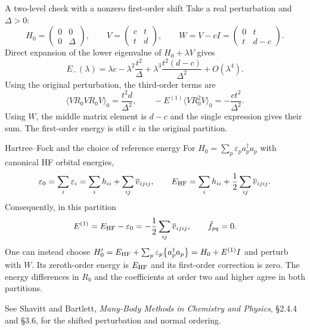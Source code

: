 \documentclass[aspectratio=169,10pt]{beamer}
\newcommand{\av}[1]{\langle #1\rangle_0}
\newcommand{\cre}[1]{a_{#1}^{\dagger}}
\newcommand{\ann}[1]{a_{#1}}
\newcommand{\no}[1]{\bigl\{#1\bigr\}}
\newcommand{\vbar}[4]{\overline v_{#1#2#3#4}}
\newcommand{\ftil}[1]{\tilde f_{#1}}
\begin{document}
\begin{frame}{A two-level check with a nonzero first-order shift}
Take a real perturbation and $\Delta>0$:
\[
 H_0=\begin{pmatrix}0&0\\0&\Delta\end{pmatrix},\qquad
 V=\begin{pmatrix}c&t\\t&d\end{pmatrix},\qquad
 W=V-cI=\begin{pmatrix}0&t\\t&d-c\end{pmatrix}.
\]
Direct expansion of the lower eigenvalue of $H_0+\lambda V$ gives
\[
 E_-(\lambda)=\lambda c-\lambda^2\frac{t^2}{\Delta}
       +\lambda^3\frac{t^2(d-c)}{\Delta^2}+O(\lambda^4).
\]
Using the original perturbation, the third-order terms are
\[
 \av{VR_0VR_0V}=\frac{t^2d}{\Delta^2},\qquad
 -E^{(1)}\av{VR_0^2V}=-\frac{ct^2}{\Delta^2}.
\]
Using $W$, the middle matrix element is $d-c$ and the single expression gives their sum. The first-order energy is still $c$ in the original partition.
\end{frame}

\begin{frame}{Hartree--Fock and the choice of reference energy}
For $H_0=\sum_p\varepsilon_p\cre{p}\ann{p}$ with canonical HF orbital energies,
\[
 \varepsilon_0=\sum_i\varepsilon_i
 =\sum_i h_{ii}+\sum_{ij}\vbar{i}{j}{i}{j},\qquad
 E_{\rm HF}=\sum_i h_{ii}+\frac12\sum_{ij}\vbar{i}{j}{i}{j}.
\]
Consequently, in this partition
\[
 E^{(1)}=E_{\rm HF}-\varepsilon_0=-\frac12\sum_{ij}\vbar{i}{j}{i}{j},
 \qquad \ftil{pq}=0.
\]
One can instead choose $H'_0=E_{\rm HF}+\sum_p\varepsilon_p\no{\cre{p}\ann{p}}=H_0+E^{(1)}I$ and perturb with $W$.
Its zeroth-order energy is $E_{\rm HF}$ and its first-order correction is zero. The energy differences in $R_0$ and the coefficients at order two and higher agree in both partitions.
\medskip

\footnotesize See Shavitt and Bartlett, \emph{Many-Body Methods in Chemistry and Physics}, \S2.4.4 and \S3.6, for the shifted perturbation and normal ordering.
\end{frame}
\end{document}
